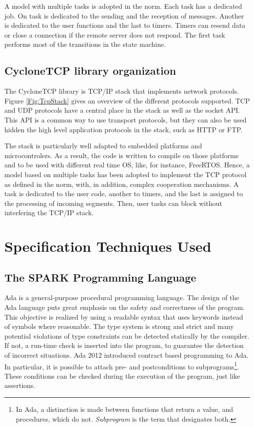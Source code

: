 \documentclass[runningheads]{llncs}
\begin{document}
A model with multiple tasks is adopted in the norm.
Each task has a dedicated job. On task is dedicated to the sending and the reception of messages.
Another is dedicated to the user functions and the last to timers. Timers can resend data or close
a connection if the remote server does not respond.
The first task performs most of the transitions in the state machine.


\subsection{CycloneTCP library organization}

    

    The CycloneTCP library is TCP/IP stack that implements network protocols.
    Figure \ref{Fig:TcpStack} gives an overview of the different protocols supported.
    TCP and UDP protocols have a central place in the stack as well as the socket API.
    This API is a common way to use transport protocols, but they can also be used
    hidden the high level application protocols in the stack, such as HTTP or FTP.

    The stack is particularly well adapted to embedded platforms and microcontrolers. As a result, the code is written
    to compile on those platforms and to be used with different real time OS, like, for instance, FreeRTOS.
    Hence, a model based on multiple tasks has been adopted to implement the TCP protocol as defined in the norm, with,
    in addition, complex cooperation mechanisms. A task is dedicated to the user code, another to timers, and the last is
    assigned to the processing of incoming segments. Then, user tasks can block without interfering the TCP/IP stack.

\section{Specification Techniques Used}
\label{sec:spec}

\subsection{The SPARK Programming Language}

Ada is a general-purpose procedural programming language. The design of the Ada
language puts great emphasis on the safety and correctness of the program. This
objective is realized by using a readable syntax that uses keywords instead of
symbols where reasonable. The type system is strong and strict and many
potential violations of type constraints can be detected statically by the
compiler. If not, a run-time check is inserted into the program, to guarantee
the detection of incorrect situations. Ada 2012 introduced contract based
programming to Ada. In particular, it is possible to attach pre- and
postconditions to subprograms\footnote{In Ada, a distinction is made between
  functions that return a value, and procedures, which do
  not. \emph{Subprogram} is the term that designates both.}.  These conditions
can be checked during the execution of the program, just like assertions.
\end{document}
